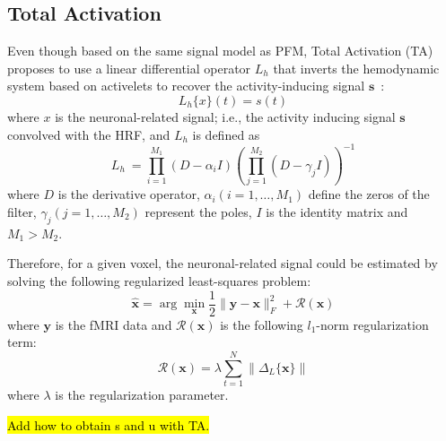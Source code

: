 \subsection{Total Activation}
Even though based on the same signal model as PFM, Total Activation (TA) proposes to use a linear differential operator \(L_h\) that inverts the hemodynamic system based on activelets to recover the activity-inducing signal \(\mathbf{s}\)~\cite{khalidov2011activelets,karahanouglu2013total}:
\begin{equation}
    L_h\{x\}(t) = s(t)
\end{equation}
where \(x\) is the neuronal-related signal; i.e., the activity inducing signal \(\mathbf{s}\) convolved with the HRF, and \(L_h\) is defined as
\begin{equation}
    L_h\ = \prod_{i=1}^{M_1} (D-\alpha_i I) (\prod_{j=1}^{M_2} (D - \gamma_j I))^{-1}
\end{equation}
where \(D\) is the derivative operator, \(\alpha_i (i=1, \hdots, M_1)\) define the zeros of the filter, \(\gamma_j (j=1, \hdots, M_2)\) represent the poles, \(I\) is the identity matrix and \(M_1 > M_2\).

Therefore, for a given voxel, the neuronal-related signal could be estimated by solving the following regularized least-squares problem:
\begin{equation}
    \hat{\mathbf{x}} = \arg \min_{\mathbf{x}} \frac{1}{2} \| \mathbf{y} - \mathbf{x} \|_F^2 + \mathcal{R}(\mathbf{x})
\end{equation}
where \(\mathbf{y}\) is the fMRI data and \(\mathcal{R}(\mathbf{x})\) is the following \(l_1\)-norm regularization term:
\begin{equation}
    \mathcal{R}(\mathbf{x}) = \lambda \sum_{t=1}^N \| \Delta_L \{\mathbf{x}\} \|
\end{equation}
where \(\lambda\) is the regularization parameter.

\hl{Add how to obtain s and u with TA.}